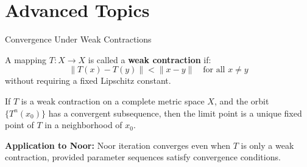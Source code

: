 \documentclass[aspectratio=169,10pt]{beamer}
\begin{document}

\section{Advanced Topics}

\begin{frame}{Convergence Under Weak Contractions}

\begin{definition}
A mapping $T: X \to X$ is called a \textbf{weak contraction} if:
$$\|T(x) - T(y)\| < \|x - y\| \quad \text{for all } x \neq y$$
without requiring a fixed Lipschitz constant.
\end{definition}

\vspace{0.3cm}

\begin{theorem}
If $T$ is a weak contraction on a complete metric space $X$, and the orbit $\{T^n(x_0)\}$ has a convergent subsequence, then the limit point is a unique fixed point of $T$ in a neighborhood of $x_0$.
\end{theorem}

\vspace{0.3cm}

\textbf{Application to Noor:} Noor iteration converges even when $T$ is only a weak contraction, provided parameter sequences satisfy convergence conditions.

\end{frame}
\end{document}
